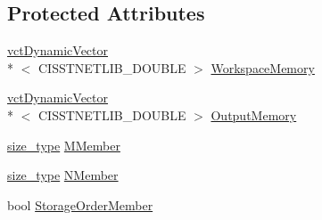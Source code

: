 \subsection*{Protected Attributes}
\begin{DoxyCompactItemize}
\item 
\hyperlink{classvct_dynamic_vector}{vct\-Dynamic\-Vector}\\*
$<$ C\-I\-S\-S\-T\-N\-E\-T\-L\-I\-B\-\_\-\-D\-O\-U\-B\-L\-E $>$ \hyperlink{classnmr_p_inverse_economy_dynamic_data_a8173778ec72de535c484ae4c4e67b5ad}{Workspace\-Memory}
\item 
\hyperlink{classvct_dynamic_vector}{vct\-Dynamic\-Vector}\\*
$<$ C\-I\-S\-S\-T\-N\-E\-T\-L\-I\-B\-\_\-\-D\-O\-U\-B\-L\-E $>$ \hyperlink{classnmr_p_inverse_economy_dynamic_data_acd646cf6e26e35d878c288e5ef92d066}{Output\-Memory}
\item 
\hyperlink{classnmr_p_inverse_economy_dynamic_data_a32ab8d601abf927292b49d0cea124f9b}{size\-\_\-type} \hyperlink{classnmr_p_inverse_economy_dynamic_data_a73a011df64f131734e80ea6bb651a15c}{M\-Member}
\item 
\hyperlink{classnmr_p_inverse_economy_dynamic_data_a32ab8d601abf927292b49d0cea124f9b}{size\-\_\-type} \hyperlink{classnmr_p_inverse_economy_dynamic_data_aac7c62f4358ca1de71b05bd69621793a}{N\-Member}
\item 
bool \hyperlink{classnmr_p_inverse_economy_dynamic_data_ad55d46196af57e35da890f204b503e6c}{Storage\-Order\-Member}
\end{DoxyCompactItemize}
{\bf }\par
